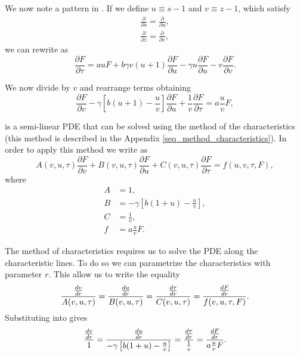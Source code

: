 We now note a pattern in . If we define $u \equiv s - 1$ and $v \equiv z - 1$, which satisfy
\begin{align}
  \frac{\partial}{\partial s} = \frac{\partial}{\partial u},\\
  \frac{\partial}{\partial z} = \frac{\partial}{\partial v},
\end{align}
we can rewrite  as
\begin{equation}
  \frac{\partial F}{\partial \tau} =
  a u F
  + b \gamma v \left( u + 1  \right) \frac{\partial F}{\partial u}
  - \gamma u \frac{\partial F}{\partial u}
  - v \frac{\partial F}{\partial v}.
\end{equation}

We now divide by $v$ and rearrange terms obtaining
\begin{equation}
  \frac{\partial F}{\partial v}
  - \gamma \left[ b (u + 1) - \frac{u}{v} \right] \frac{\partial F}{\partial u}
  + \frac{1}{v} \frac{\partial F}{\partial \tau}
  = a \frac{u}{v} F,
  \label{eq_swain_2}
\end{equation}

\eref[eq_swain_2] is a semi-linear PDE that can be solved using the method of
the characteristics (this method is described in the Appendix
\ref{seq_method_characteristics}). In order to apply this method we write
\eref[eq_swain_2] as
\begin{equation}
  A(v, u, \tau) \frac{\partial F}{\partial v}
  + B(v, u, \tau) \frac{\partial F}{\partial u}
  + C(v, u, \tau) \frac{\partial F}{\partial \tau}
  = f(u, v, \tau, F),
\end{equation}
where
\begin{equation}
  \begin{aligned}
  A &= 1,\\
  B &= - \gamma \left[ b (1 + u) - \frac{u}{v} \right],\\
  C &= \frac{1}{v},\\
  f &= a \frac{u}{v} F.
  \label{eq_coef_definition}
  \end{aligned}
\end{equation}

The method of characteristics requires us to solve the PDE along the
characteristic lines. To do so we can parametrize the characteristics with
parameter $r$. This allow us to write the equality
\begin{equation}
  {{dv \over dr} \over A(v, u, \tau)} =
  {{du \over dr} \over B(v, u, \tau)} =
  {{d\tau \over dr} \over C(v, u, \tau)} =
  {{dF \over dr} \over f(v, u, \tau, F)}.
  \label{eq_lagrange_charpit}
\end{equation}
Substituting  into  gives
\begin{equation}
  {{dv \over dr} \over 1} =
  {{du \over dr} \over - \gamma \left[ b (1 + u) - \frac{u}{v} \right]} =
  {{d\tau \over dr} \over {1 \over v}} =
  {{dF \over dr} \over a \frac{u}{v} F}.
\end{equation}

